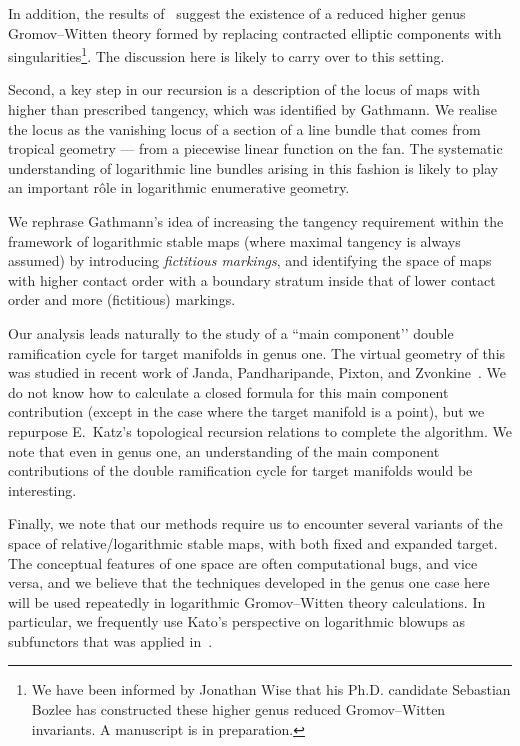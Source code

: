 \documentclass[11pt]{amsart}
\theoremstyle{definition}
\theoremstyle{definition}
\begin{document}
In addition, the results of~\cite{RSPW} suggest the existence of a reduced higher genus Gromov--Witten theory formed by replacing contracted elliptic components with singularities\footnote{We have been informed by Jonathan Wise that his Ph.D. candidate Sebastian Bozlee has constructed these higher genus reduced Gromov--Witten invariants. A manuscript is in preparation.}. The discussion here is likely to carry over to this setting.

Second, a key step in our recursion is a description of the locus of maps with higher than prescribed tangency, which was identified by Gathmann. We realise the locus as the vanishing locus of a section of a line bundle that comes from tropical geometry — from a piecewise linear function on the fan. The systematic understanding of logarithmic line bundles arising in this fashion is likely to play an important r\^ole in logarithmic enumerative geometry.

We rephrase Gathmann's idea of increasing the tangency requirement within the framework of logarithmic stable maps (where maximal tangency is always assumed) by introducing \emph{fictitious markings}, and identifying the space of maps with higher contact order with a boundary stratum inside that of lower contact order and more (fictitious) markings.

Our analysis leads naturally to the study of a ``main component’’ double ramification cycle for target manifolds in genus one. The virtual geometry of this was studied in recent work of Janda, Pandharipande, Pixton, and Zvonkine~\cite{DRCBundle}. We do not know how to calculate a closed formula for this main component contribution (except in the case where the target manifold is a point), but we repurpose E.~Katz's topological recursion relations \cite{EKatz} to complete the algorithm. We note that even in genus one, an understanding of the main component contributions of the double ramification cycle for target manifolds would be interesting.

Finally, we note that our methods require us to encounter several variants of the space of relative/logarithmic stable maps, with both fixed and expanded target. The conceptual features of one space are often computational bugs, and vice versa, and we believe that the techniques developed in the genus one case here will be used repeatedly in logarithmic Gromov--Witten theory calculations. In particular, we frequently use Kato's perspective on logarithmic blowups as subfunctors that was applied in~\cite{RSPW,RSPW2}.
\end{document}
